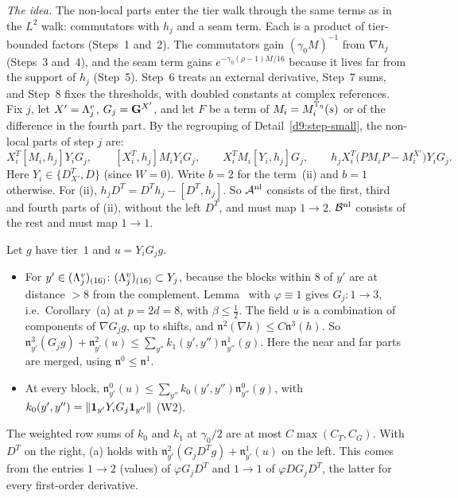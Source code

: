 \begin{detail}\label{d9:nl-tiers}
\emph{The idea.} The non-local parts enter the tier walk through the same terms as in the $L^2$ walk: commutators with $h_j$ and a seam term. Each is a product of tier-bounded factors (Steps~1 and~2). The commutators gain $(\gamma_0M)^{-1}$ from $\nabla h_j$ (Steps~3 and~4), and the seam term gains $e^{-\gamma_0(\rho-1)M/16}$ because it lives far from the support of $h_j$ (Step~5). Step~6 treats an external derivative, Step~7 sums, and Step~8 fixes the thresholds, with doubled constants at complex references.
Fix $j$, let $X'=\Lambda^v_j$, $G_j=\mathbf G^{X'}$, and let $F$ be a term of $M_i=M_i^{\mathbb T_\eta}(s)$ or of the difference in the fourth part. By the regrouping of Detail~\ref{d9:step-small}, the non-local parts of step $j$ are:
\[
X_i^T[M_i,h_j]Y_iG_j,\qquad[X_i^T,h_j]M_iY_iG_j,\qquad X_i^TM_i[Y_i,h_j]G_j,\qquad h_jX_i^T\big(PM_iP-M_i^{X'}\big)Y_iG_j .
\]
Here $Y_i\in\{D^T_{X'},D\}$ (since $W=0$). Write $b=2$ for the term~(ii) and $b=1$ otherwise. For (ii), $h_jD^T=D^Th_j-[D^T,h_j]$. So $\mathcal A^{\rm nl}$ consists of the first, third and fourth parts of (ii), without the left $D^T$, and must map $1\to2$. $\mathcal B^{\rm nl}$ consists of the rest and must map $1\to1$.
\begin{step}
Let $g$ have tier~$1$ and $u=Y_iG_jg$.
\begin{itemize}
\item[(a)] For $y'\in(\Lambda^v_j)_{(16)}$: $(\Lambda^v_j)_{(16)}\subset Y_j$, because the blocks within $8$ of $y'$ are at distance $>8$ from the complement. Lemma~ with $\varphi\equiv1$ gives $G_j\colon1\to3$, i.e.\ Corollary~(a) at $p=2d=8$, with $\beta\le\frac12$. The field $u$ is a combination of components of $\nabla G_jg$, up to shifts, and $\mathfrak n^2(\nabla h)\le C\mathfrak n^3(h)$. So $\mathfrak n^3_{y'}(G_jg)+\mathfrak n^2_{y'}(u)\le\sum_{y''}k_1(y',y'')\mathfrak n^1_{y''}(g)$. Here the near and far parts are merged, using $\mathfrak n^0\le\mathfrak n^1$.
\item[(b)] At every block, $\mathfrak n^0_{y'}(u)\le\sum_{y''}k_0(y',y'')\mathfrak n^0_{y''}(g)$, with $k_0(y',y'')=\|\mathbf 1_{y'}Y_iG_j\mathbf 1_{y''}\|$ (W2).
\end{itemize}
The weighted row sums of $k_0$ and $k_1$ at $\gamma_0/2$ are at most $C\max(C_T,C_G)$. With $D^T$ on the right, (a) holds with $\mathfrak n^2_{y'}(G_jD^Tg)+\mathfrak n^1_{y'}(u)$ on the left. This comes from the entries $1\to2$ (values) of $\varphi G_jD^T$ and $1\to1$ of $\varphi DG_jD^T$, the latter for every first-order derivative.

\end{step}
\end{detail}
